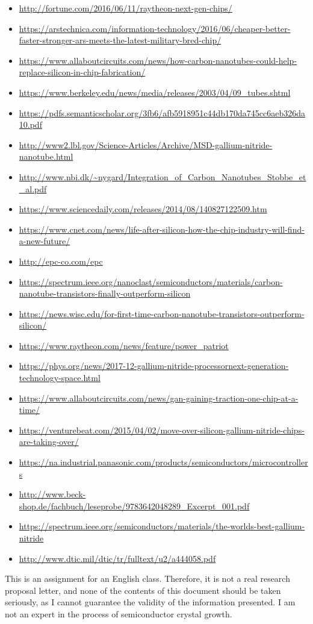 \documentclass[letterpaper]{letter}
\begin{document}
\begin{itemize}
  \item \url{http://fortune.com/2016/06/11/raytheon-next-gen-chips/}
  \item \url{https://arstechnica.com/information-technology/2016/06/cheaper-better-faster-stronger-ars-meets-the-latest-military-bred-chip/}
  \item \url{https://www.allaboutcircuits.com/news/how-carbon-nanotubes-could-help-replace-silicon-in-chip-fabrication/}
  \item \url{https://www.berkeley.edu/news/media/releases/2003/04/09_tubes.shtml}
  \item \url{https://pdfs.semanticscholar.org/3fb6/afb5918951c44db170da745cc6aeb326da10.pdf}
  \item \url{http://www2.lbl.gov/Science-Articles/Archive/MSD-gallium-nitride-nanotube.html}
  \item \url{http://www.nbi.dk/~nygard/Integration_of_Carbon_Nanotubes_Stobbe_et_al.pdf}
  \item \url{https://www.sciencedaily.com/releases/2014/08/140827122509.htm}
  \item \url{https://www.cnet.com/news/life-after-silicon-how-the-chip-industry-will-find-a-new-future/}
  \item \url{http://epc-co.com/epc}
  \item \url{https://spectrum.ieee.org/nanoclast/semiconductors/materials/carbon-nanotube-transistors-finally-outperform-silicon}
  \item \url{https://news.wisc.edu/for-first-time-carbon-nanotube-transistors-outperform-silicon/}
  \item \url{https://www.raytheon.com/news/feature/power_patriot}
  \item \url{https://phys.org/news/2017-12-gallium-nitride-processornext-generation-technology-space.html}
  \item \url{https://www.allaboutcircuits.com/news/gan-gaining-traction-one-chip-at-a-time/}
  \item \url{https://venturebeat.com/2015/04/02/move-over-silicon-gallium-nitride-chips-are-taking-over/}
  \item \url{https://na.industrial.panasonic.com/products/semiconductors/microcontrollers}
  \item \url{http://www.beck-shop.de/fachbuch/leseprobe/9783642048289_Excerpt_001.pdf}
  \item \url{https://spectrum.ieee.org/semiconductors/materials/the-worlds-best-gallium-nitride}
  \item \url{http://www.dtic.mil/dtic/tr/fulltext/u2/a444058.pdf}
\end{itemize}
\vspace*{\fill}
This is an assignment for an English class. Therefore, it is not a real research
proposal letter, and none of the contents of this document should be taken
seriously, as I cannot guarantee the validity of the information presented. I am
not an expert in the process of semiconductor crystal growth.
\end{document}
